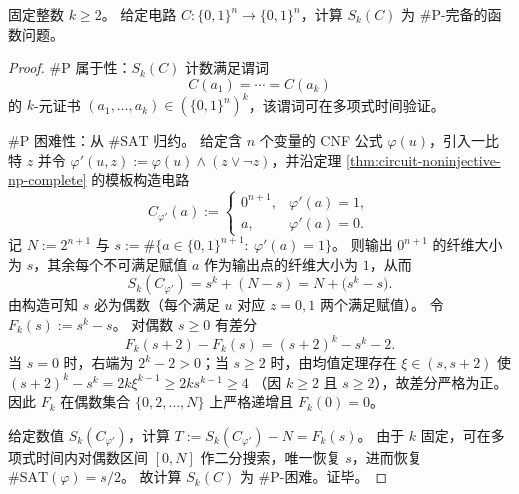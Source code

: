 \begin{theorem}\label{thm:circuit-sk-fixedk-sharpP-complete}
固定整数 \(k\ge 2\)。
给定电路 \(C:\{0,1\}^n\to\{0,1\}^n\)，计算 \(S_k(C)\) 为 \(\#\mathrm{P}\)-完备的函数问题。
\end{theorem}
\begin{proof}
\(\#\mathrm{P}\) 属于性：\(S_k(C)\) 计数满足谓词
\[
C(a_1)=\cdots=C(a_k)
\]
的 \(k\)-元证书 \((a_1,\dots,a_k)\in(\{0,1\}^n)^k\)，该谓词可在多项式时间验证。
\par
\(\#\mathrm{P}\) 困难性：从 \(\#\mathrm{SAT}\) 归约。
给定含 \(n\) 个变量的 CNF 公式 \(\varphi(u)\)，引入一比特 \(z\) 并令 \(\varphi'(u,z):=\varphi(u)\wedge(z\vee\neg z)\)，并沿定理 \ref{thm:circuit-noninjective-np-complete} 的模板构造电路
\[
C_{\varphi'}(a):=
\begin{cases}
0^{n+1}, & \varphi'(a)=1,\\
a, & \varphi'(a)=0.
\end{cases}
\]
记 \(N:=2^{n+1}\) 与
\(
s:=\#\{a\in\{0,1\}^{n+1}:\ \varphi'(a)=1\}
\)。
则输出 \(0^{n+1}\) 的纤维大小为 \(s\)，其余每个不可满足赋值 \(a\) 作为输出点的纤维大小为 \(1\)，从而
\[
S_k(C_{\varphi'})=s^k+(N-s)=N+\bigl(s^k-s\bigr).
\]
由构造可知 \(s\) 必为偶数（每个满足 \(u\) 对应 \(z=0,1\) 两个满足赋值）。
令 \(F_k(s):=s^k-s\)。
对偶数 \(s\ge 0\) 有差分
\[
F_k(s+2)-F_k(s)=(s+2)^k-s^k-2.
\]
当 \(s=0\) 时，右端为 \(2^k-2>0\)；当 \(s\ge 2\) 时，由均值定理存在 \(\xi\in(s,s+2)\) 使
\(
(s+2)^k-s^k=2k\xi^{k-1}\ge 2k s^{k-1}\ge 4
\)
（因 \(k\ge 2\) 且 \(s\ge 2\)），故差分严格为正。
因此 \(F_k\) 在偶数集合 \(\{0,2,\dots,N\}\) 上严格递增且 \(F_k(0)=0\)。
\par
给定数值 \(S_k(C_{\varphi'})\)，计算
\(
T:=S_k(C_{\varphi'})-N=F_k(s)
\)。
由于 \(k\) 固定，可在多项式时间内对偶数区间 \([0,N]\) 作二分搜索，唯一恢复 \(s\)，进而恢复 \(\#\mathrm{SAT}(\varphi)=s/2\)。
故计算 \(S_k(C)\) 为 \(\#\mathrm{P}\)-困难。证毕。
\end{proof}

